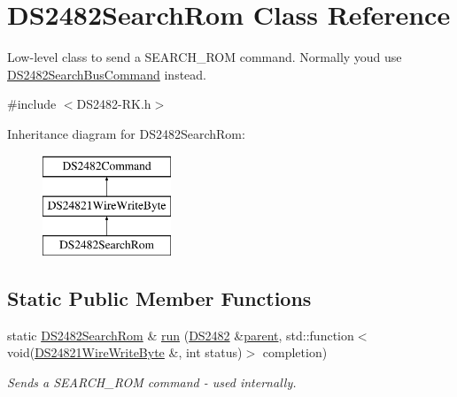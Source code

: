\hypertarget{class_d_s2482_search_rom}{}\section{D\+S2482\+Search\+Rom Class Reference}
\label{class_d_s2482_search_rom}


Low-\/level class to send a S\+E\+A\+R\+C\+H\+\_\+\+R\+OM command. Normally you\textquotesingle{}d use \mbox{\hyperlink{class_d_s2482_search_bus_command}{D\+S2482\+Search\+Bus\+Command}} instead.  




{\ttfamily \#include $<$D\+S2482-\/\+R\+K.\+h$>$}

Inheritance diagram for D\+S2482\+Search\+Rom\+:\begin{figure}[H]
\begin{center}
\leavevmode
\includegraphics[height=3.000000cm]{class_d_s2482_search_rom}
\end{center}
\end{figure}
\subsection*{Static Public Member Functions}
\begin{DoxyCompactItemize}
\item 
\mbox{\label{class_d_s2482_search_rom_aae9ecbe1d0b5e5dac6a38f1c4a2090f8}} 
static \mbox{\hyperlink{class_d_s2482_search_rom}{D\+S2482\+Search\+Rom}} \& \mbox{\hyperlink{class_d_s2482_search_rom_aae9ecbe1d0b5e5dac6a38f1c4a2090f8}{run}} (\mbox{\hyperlink{class_d_s2482}{D\+S2482}} \&\mbox{\hyperlink{class_d_s2482_command_a54a41fb8a610ef2077f5e5377771aaf3}{parent}}, std\+::function$<$ void(\mbox{\hyperlink{class_d_s24821_wire_write_byte}{D\+S24821\+Wire\+Write\+Byte}} \&, int status)$>$ completion)
\begin{DoxyCompactList}\small\item\em Sends a S\+E\+A\+R\+C\+H\+\_\+\+R\+OM command -\/ used internally. \end{DoxyCompactList}\end{DoxyCompactItemize}
